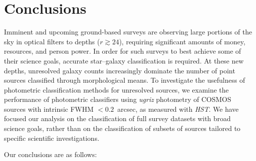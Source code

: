 \documentclass[12pt,preprint]{aastex}
\begin{document}
%
%


\section{Conclusions}

Imminent and upcoming ground-based surveys are observing large
portions of the sky in optical filters to depths ($r\gtrsim24$),
requiring significant amounts of money, resources, and person power.
In order for such surveys to best achieve some of their science goals,
accurate star--galaxy classification is required.  At these new
depths, unresolved galaxy counts increasingly dominate the number of
point sources classified through morphological means.  To investigate
the usefulness of photometric classification methods for unresolved
sources, we examine the performance of photometric classifiers using
{\it ugriz} photometry of COSMOS sources with intrinsic FWHM
$<0.2$~arcsec, as measured with {\it HST}.  We have focused our
analysis on the classification of full survey datasets with broad
science goals, rather than on the classification of subsets of sources
tailored to specific scientific investigations.

Our conclusions are as follows:
\end{document}
